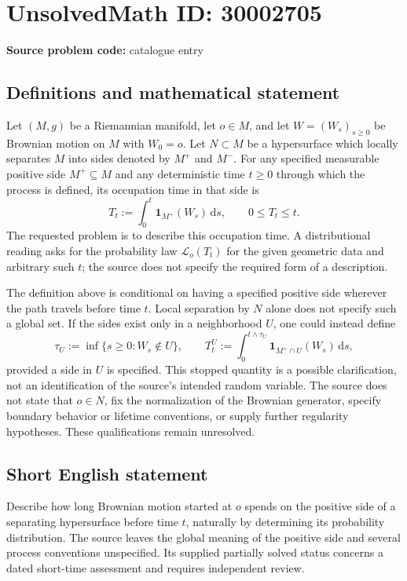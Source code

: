\documentclass[11pt]{article}
\begin{document}
\section*{UnsolvedMath ID: 30002705}
\textbf{Source problem code:} catalogue entry
\subsection{Definitions and mathematical statement}
Let \((M,g)\) be a Riemannian manifold, let \(o\in M\), and let \(W=(W_s)_{s\geq 0}\) be Brownian motion on \(M\) with \(W_0=o\). Let \(N\subset M\) be a hypersurface which locally separates \(M\) into sides denoted by \(M^+\) and \(M^-\). For any specified measurable positive side \(M^+\subseteq M\) and any deterministic time \(t\geq 0\) through which the process is defined, its occupation time in that side is
\[
T_t:=\int_0^t \mathbf{1}_{M^+}(W_s)\,\mathrm{d}s,
\qquad 0\leq T_t\leq t.
\]
The requested problem is to describe this occupation time. A distributional reading asks for the probability law \(\mathcal{L}_o(T_t)\) for the given geometric data and arbitrary such \(t\); the source does not specify the required form of a description.

The definition above is conditional on having a specified positive side wherever the path travels before time \(t\). Local separation by \(N\) alone does not specify such a global set. If the sides exist only in a neighborhood \(U\), one could instead define
\[
\tau_U:=\inf\{s\geq 0:W_s\notin U\},
\qquad
T_t^U:=\int_0^{t\wedge\tau_U}\mathbf{1}_{M^+\cap U}(W_s)\,\mathrm{d}s,
\]
provided a side in \(U\) is specified. This stopped quantity is a possible clarification, not an identification of the source's intended random variable. The source does not state that \(o\in N\), fix the normalization of the Brownian generator, specify boundary behavior or lifetime conventions, or supply further regularity hypotheses. These qualifications remain unresolved.
\subsection{Short English statement}
Describe how long Brownian motion started at \(o\) spends on the positive side of a separating hypersurface before time \(t\), naturally by determining its probability distribution. The source leaves the global meaning of the positive side and several process conventions unspecified. Its supplied partially solved status concerns a dated short-time assessment and requires independent review.
\end{document}
